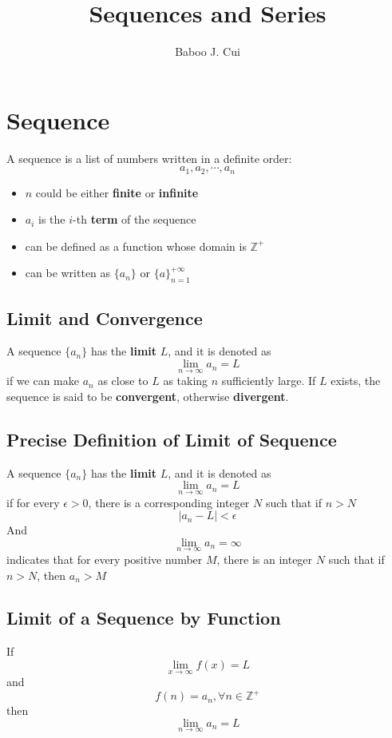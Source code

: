 \documentclass[10pt,a4paper,oneside]{article}
\author{Baboo J. Cui}
\title{Sequences and Series}
\begin{document}
\maketitle
\tableofcontents

\newpage

\section{Sequence}
A sequence is a list of numbers written in a definite order:
\[
a_1, a_2, \cdots, a_n
\]
\begin{itemize}
	\item  $n$ could be either \textbf{finite} or \textbf{infinite}
	\item $a_i$ is the $i$-th \textbf{term} of the sequence
	\item  can be defined as a function whose domain is $\mathbb{Z^+}$
	\item can be written as $\{a_n\}$ or $\{a\}_{n=1}^{+\infty}$
\end{itemize}

\subsection{Limit and Convergence}
A sequence $\{a_n\}$ has the \textbf{limit} $L$, and it is denoted as
\[
\lim_{n \rightarrow \infty} a_n = L
\]
if we can make $a_n$ as close to $L$ as taking $n$ sufficiently large. If $L$ exists, the sequence is said to be \textbf{convergent}, otherwise \textbf{divergent}.

\subsection{Precise Definition of Limit of Sequence}
A sequence $\{a_n\}$ has the \textbf{limit} $L$, and it is denoted as
\[
\lim_{n \rightarrow \infty} a_n = L
\]
if for every $\epsilon>0$, there is a corresponding integer $N$ such that if $n>N$
\[
|a_n - L| < \epsilon
\]
And 
\[
\lim_{n \rightarrow \infty} a_n = \infty
\]
indicates that for every positive number $M$, there is an integer $N$ such that if $n>N$, then $a_n > M$

\subsection{Limit of a Sequence by Function}
If
\[
\lim_{x \rightarrow \infty} f(x) = L
\]
and
\[
f(n) = a_n, \forall n \in \mathbb{Z^+}
\]
then
\[
\lim_{n \rightarrow \infty} a_n = L
\]
\end{document}

